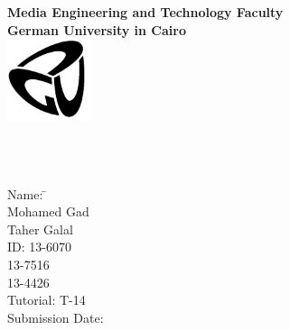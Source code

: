 \newcommand{\titlePage}{

\thispagestyle{empty}
\begin{center}
	\textbf{Media Engineering and Technology Faculty}\\[1mm]
	\textbf{German University in Cairo}\\[1mm]
	\includegraphics[width=2.5cm]{./images/GUC-logo-ss-eps-converted-to.pdf}
	
	\vspace{2cm}
	\doublespacing
	{\large \textbf{\titleOfThesisOne}}\\
	\singlespacing
	\vspace{2cm}
	{\large \textbf{\typeOfThesis}}\\
	
	\vfill
	\parbox{1cm}{
  		\begin{large}
    			\begin{tabbing}
       			Name: \hspace{2cm}  
        			\=\authorOfThesis\\[2mm]
        			\hspace{3.5cm}  Mohamed Gad\\[2mm]
        			\hspace{4cm}   Taher Galal\\[2mm]
        		ID: \hspace{4cm}
        			13-6070\\[2mm]	
        		    \hspace{4.75cm}	
        			13-7516\\[2mm]	
        		 \hspace{4.75cm}	
        			13-4426\\[2mm]	
        		Tutorial: \hspace{3cm}
        			T-14\\[2mm]		
      			Submission Date: 
        			\>\submissionDate\\
    			\end{tabbing}
  		\end{large}
	}\\
\end{center}
\clearpage
}
\titlePage
